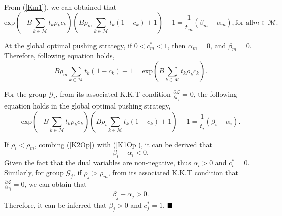 \documentclass[12pt, draftclsnofoot, onecolumn]{IEEEtran}
\begin{document}
From (\ref {Km1}), we can obtained that
\begin{equation} \label {LDiv}
\textrm{exp}{(-B\sum\limits_{k \in \mathcal{M}} t_k \rho_k c_k )}\left( B \rho_m\sum \limits_{k \in \mathcal{M}} t_k  (1- c_k) + 1\right) - 1=\frac{1}{t_m} (\beta_m-\alpha_m) , \textrm{for all} m \in \mathcal{M}.
\end{equation}

At the global optimal pushing strategy, if $0<c_m^{\ast} <1$, then $\alpha_m=0$, and $\beta_m=0$.
Therefore, following equation holds,
\begin{equation} \label {K1Op}
 B \rho_m\sum \limits_{k \in \mathcal{M}} t_k  (1- c_k) + 1 = \textrm{exp}{(B\sum\limits_{k \in \mathcal{M}} t_k \rho_k c_k )}.
\end{equation}

For the group $\mathcal{G}_{i}$, from its associated K.K.T condition $\frac{\partial \mathcal{L}}{\partial c_{i}} =0$, the following equation holds in the global optimal pushing strategy,
\begin{equation} \label{K2Op}
\textrm{exp}{(-B\sum\limits_{k \in \mathcal{M}} t_k \rho_k c_k )}\left( B \rho_i\sum \limits_{k \in \mathcal{M}} t_k  (1- c_k) + 1\right) - 1=\frac{1}{t_i} (\beta_i-\alpha_i).
\end{equation}

If $\rho_i <\rho_m$, combing (\ref {K2Op}) with (\ref {K1Op}), it can be derived that
\begin{equation}
\beta_i-\alpha_i <0.
\end{equation}
Given the fact that the dual variables are non-negative, thus $\alpha_i >0$ and $c_i^{\ast} =0$.
Similarly, for group $\mathcal{G}_{j}$, if $\rho_{j} >\rho_{m}$, from its associated K.K.T condition that $\frac{\partial \mathcal{L}}{\partial c_j} =0$, we can obtain that
\begin{equation}
\beta_j-\alpha_j >0.
\end{equation}
Therefore, it can be inferred that $\beta_j>0$ and $c_j^{\ast} =1$.
$\hfill\blacksquare$
\end{document}
